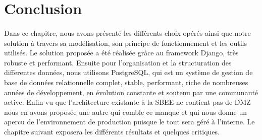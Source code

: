 	  
  \section*{Conclusion}
      \paragraph{}
	  Dans ce chapitre, nous avons présenté les diff\'erents choix opérés ainsi que notre solution à travers sa modélisation, son principe de fonctionnement et les outils utilisés.
	  Le solution propos\'ee a \'et\'e r\'ealis\'ee gr\`ace au framework Django, tr\`es robuste et performant. Ensuite pour l'organisation et la structuration des differentes donn\'ees, nous utilisons PostgreSQL, qui est un système de gestion de base de données relationnelle complet, stable, performant, riche de nombreuses années de développement, en évolution constante et soutenu par une communauté active. 
	  Enfin vu que l'architecture existante \`a la SBEE ne contient pas de DMZ nous en avons propos\'ee une autre qui comble ce manque et qui nous donne un apercu de l'environnement de production puisque le tout sera g\'er\'e \`a l'interne.
	  Le chapitre suivant exposera les différents résultats et quelques critiques.
	  